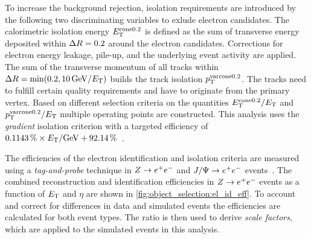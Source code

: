 To increase the background rejection, isolation requirements are introduced by the following two discriminating variables to
exlude electron candidates.
The calorimetric isolation energy $E_\text{T}^{\text{cone}0.2}$ is defined as the sum of transverse energy deposited within
$\Delta R = 0.2$ around the electron candidates.
Corrections for electron energy leakage, pile-up, and the underlying event activity are applied.
The sum of the transverse momentum of all tracks within $\dr = \min(0.2, \SI{10}{\GeV} / \et)$ builds the
track isolation $p_\text{T}^{\text{varcone}0.2}$. The tracks need to fulfill certain quality requirements and have to originate
from the primary vertex.
Based on different selection criteria on the quantities $E_\text{T}^{\text{cone}0.2} / E_\text{T}$ and
$p_\text{T}^{\text{varcone}0.2} / E_\text{T}$ multiple operating points are constructed. This analysis uses the \emph{gradient}
isolation criterion with a targeted efficiency of
$\SI{0.1143}{\percent} \times \et / \si{\GeV} + \SI{92.14}{\percent}$~\cite{ATLAS-CONF-2016-024}.

The efficiencies of the electron identification and isolation criteria are measured using a \emph{tag-and-probe} technique
in $Z \to e^+e^-$ and $J/\Psi \to e^+e^-$ events~\cite{ATLAS-CONF-2016-024}.
The combined reconstruction and identification efficiencies in $Z \to e^+e^-$ events as a function of $E_\text{T}$ and $\eta$
are shown in \cref{fig:object_selection:el_id_eff}.
To account and correct for differences in data and simulated events the efficiencies are calculated for both event types.
The ratio is then used to derive \emph{scale factors}, which are applied to the simulated events in this analysis.

